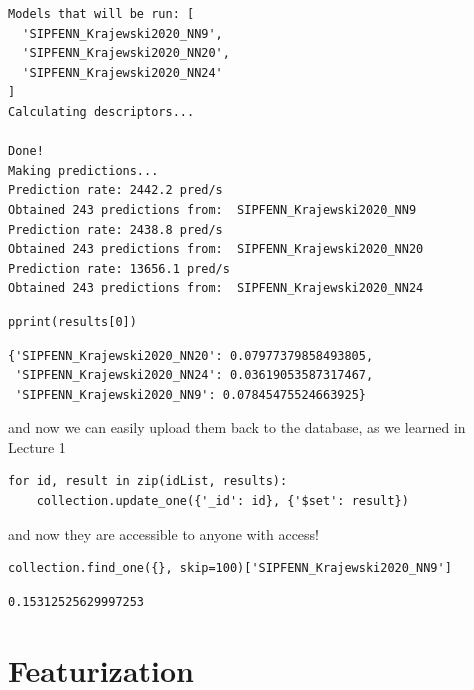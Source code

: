 \begin{verbatim}
Models that will be run: [
  'SIPFENN_Krajewski2020_NN9', 
  'SIPFENN_Krajewski2020_NN20', 
  'SIPFENN_Krajewski2020_NN24'
]
Calculating descriptors...

Done!
Making predictions...
Prediction rate: 2442.2 pred/s
Obtained 243 predictions from:  SIPFENN_Krajewski2020_NN9
Prediction rate: 2438.8 pred/s
Obtained 243 predictions from:  SIPFENN_Krajewski2020_NN20
Prediction rate: 13656.1 pred/s
Obtained 243 predictions from:  SIPFENN_Krajewski2020_NN24
\end{verbatim}

\begin{verbatim}
pprint(results[0])
\end{verbatim}

\begin{verbatim}
{'SIPFENN_Krajewski2020_NN20': 0.07977379858493805,
 'SIPFENN_Krajewski2020_NN24': 0.03619053587317467,
 'SIPFENN_Krajewski2020_NN9': 0.07845475524663925}
\end{verbatim}

and now we can easily upload them back to the database, as we learned in
Lecture 1

\begin{verbatim}
for id, result in zip(idList, results):
    collection.update_one({'_id': id}, {'$set': result})
\end{verbatim}

and now they are accessible to anyone with access!

\begin{verbatim}
collection.find_one({}, skip=100)['SIPFENN_Krajewski2020_NN9']
\end{verbatim}

\begin{verbatim}
0.15312525629997253
\end{verbatim}

\hypertarget{featurization}{%
\section{Featurization}\label{pysipfenntutorial2:featurization}}

